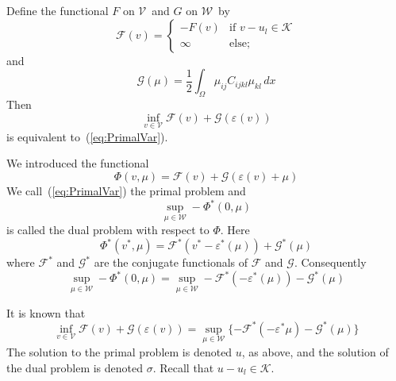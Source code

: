 \documentclass[12pt,a4paper]{article}
\numberwithin{equation}{section}
\numberwithin{table}{section}
\numberwithin{figure}{section}
\newcommand{\W}{\ensuremath{\mathcal{W}}}
\newcommand{\half}{\ensuremath{\frac{1}{2}}}
\newcommand{\V}{\ensuremath{\mathcal{V}}}
\newcommand{\K}{\ensuremath{\mathcal{K}}}
\newcommand{\F}{\ensuremath{{\mathcal F}}}
\newcommand{\G}{\ensuremath{{\mathcal G}}}
\newcommand{\intO}{\int_\Omega\!\!}
\renewcommand{\epsilon}{\varepsilon}
\newcommand{\strain}[1][]{\ensuremath{\epsilon_{#1}}}
\newcommand{\infvinV}{\ensuremath{\inf_{v\in \V}}}
\newcommand{\dx}{{\,dx}}
\begin{document}
Define the functional $F$ on \V\ and $G$ on \W\ by
\begin{equation}
  \F(v) =
  \begin{cases}
    -F(v) & \text{if } v-u_l \in \K \\
    \infty & \text{else;}
  \end{cases}
\end{equation}
and
\begin{equation}
  \G(\mu) = \half \intO \mu_{ij} C_{ijkl} \mu_{kl} \dx
\end{equation}
Then
\begin{equation}
  \infvinV \F(v) + \G(\strain(v))
\end{equation}
is equivalent to~(\ref{eq:PrimalVar}).

We introduced the functional
\begin{equation}
\varPhi(v,\mu) = \F(v) + \G(\epsilon(v) + \mu)
\end{equation}
We call~(\ref{eq:PrimalVar}) the primal problem and
\begin{equation}
  \sup_{\mu\in \W} -\varPhi^*(0,\mu)
\end{equation}
is called the dual problem with respect to $\varPhi$.  Here
\begin{equation}
  \varPhi^*(v^*,\mu) = \F^*(v^*-\epsilon^*(\mu)) + \G^*(\mu)
\end{equation}
where $\F^*$ and $\G^*$ are the conjugate functionals of $\F$ and $\G$.  Consequently
\begin{equation}
  \sup_{\mu\in \W} -\varPhi^*(0,\mu)
  = \sup_{\mu\in \W} -\F^*(-\epsilon^*(\mu)) - \G^*(\mu)
\end{equation}

It is known that
\begin{equation}
  \label{eq:PrimalDual}
  \infvinV \F(v) + \G(\strain(v))
  = \sup_{\mu\in \W} \{ - \F^*(-\strain^* \mu) - \G^*(\mu) \}
\end{equation}
The solution to the primal problem is denoted $u$, as above, and the solution of the dual
problem is denoted $\sigma$.  Recall that $u-u_l\in \K$. 
\end{document}
